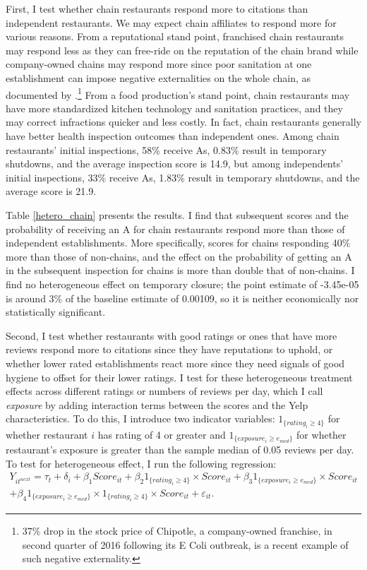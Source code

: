 \documentclass[12pt]{article}
\begin{document}
First, I test whether chain restaurants respond more to citations than independent restaurants. We may expect chain affiliates to respond more for various reasons. From a reputational stand point, franchised chain restaurants may respond less as they can free-ride on the reputation of the chain brand while company-owned chains may respond more since poor sanitation at one establishment can impose negative externalities on the whole chain, as documented by \cite{jie_leslie_09}.\footnote{37\% drop in the stock price of Chipotle, a company-owned franchise, in second quarter of 2016 following its E Coli outbreak, is a recent example of such negative externality.} From a food production's stand point, chain restaurants may have more standardized kitchen technology and sanitation practices, and they may correct infractions quicker and less costly. In fact, chain restaurants generally have better health inspection outcomes than independent ones. Among chain restaurants' initial inspections, 58\% receive As, 0.83\% result in temporary shutdowns, and the average inspection score is 14.9, but among independents' initial inspections, 33\% receive As, 1.83\% result in temporary shutdowns, and the average score is 21.9.

Table \ref{hetero_chain} presents the results. I find that subsequent scores and the probability of receiving an A for chain restaurants respond more than those of independent establishments. More specifically,  scores for chains responding 40\% more than those of non-chains, and the effect on the probability of getting an A in the subsequent inspection for chains is more than double that of non-chains. I find no heterogeneous effect on temporary closure; the point estimate of -3.45e-05 is around 3\% of the baseline estimate of 0.00109, so it is neither economically nor statistically significant. 

Second, I test whether restaurants with good ratings or ones that have more reviews respond more to citations since they have reputations to uphold, or whether lower rated establishments react more since they need signals of good hygiene to offset for their lower ratings. I test for these heterogeneous treatment effects across different ratings or numbers of reviews per day, which I call \emph{exposure} by adding interaction terms between the scores and the Yelp characteristics. To do this, I introduce two indicator variables: $1_{\{rating_i \geq 4\}}$ for whether restaurant $i$ has rating of 4 or greater and $1_{\{exposure_i \geq e_{med}\}}$ for whether restaurant's exposure is greater than the sample median of 0.05 reviews per day. To test for heterogeneous effect, I run the following regression: 
\begin{align}
\label{yelp_hetero}
Y_{it^{next}} = \tau_t + \delta_i +  \beta_1 Score_{it} + \beta_2 1_{\{rating_i \geq 4\} } \times Score_{it} +  \beta_3 1_{\{exposure_i \geq e_{med} \}} \times Score_{it} \\
+ \beta_4 1_{\{exposure_i \geq e_{med}\}} \times 1_{\{rating_i \geq 4\}}\times Score_{it} + \varepsilon_{it}. 
\end{align}
\end{document}
